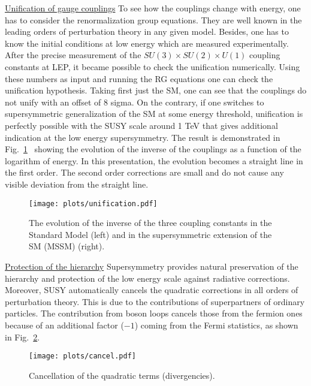 \documentclass{cernyrep}
\begin{document}
\underline{Unification of gauge couplings}
To see how the couplings change with energy, one has to consider the renormalization group equations. They are well known in the leading orders of perturbation theory in any given model.
Besides, one has to know the initial conditions at low energy which are measured experimentally.
After the precise measurement of the $SU(3)\times SU(2) \times
U(1)$ coupling constants at LEP, it became possible to check the
unification numerically. Using these numbers as input and running the RG equations one can check the unification hypothesis.  Taking first just the SM, one can see that the couplings do not unify with an offset of 8 sigma. On the contrary, if one switches  to supersymmetric generalization of the SM at some energy threshold, unification is perfectly possible with the SUSY scale around 1 TeV that gives additional indication at the low energy supersymmetry. 
The result is demonstrated in Fig.~\ref{unif}~\cite{ABF} showing the
evolution of the inverse of the couplings as a function of the
logarithm of energy. In this presentation, the evolution becomes
a straight line in the first order. The second order corrections
are small and do not cause any visible deviation from the
straight line. 
%
\begin{figure}[htb]
\begin{center}
\leavevmode
\texttt{[image: plots/unification.pdf]}
\vspace*{-10mm}
\end{center}
\caption{The evolution of the inverse of the three coupling
constants in the Standard Model (left) and in the supersymmetric
extension of the SM (MSSM) (right).}
\label{unif}
\end{figure}



\underline{Protection of the hierarchy}
Supersymmetry provides natural preservation of the hierarchy and
protection of the low energy scale against radiative corrections. 
Moreover, SUSY
automatically cancels the quadratic corrections in all orders
of perturbation theory. This is due to the contributions
of superpartners of ordinary particles. The contribution from
boson loops cancels those from the fermion ones because of an
additional factor ($-1$) coming from the Fermi statistics,
as shown in Fig.~\ref{fig:cancel}.
\begin{figure}[htb]
\begin{center}
\leavevmode
\texttt{[image: plots/cancel.pdf]}
\end{center}
\vspace{-6mm}
\caption{Cancellation of the quadratic terms (divergencies).}
\label{fig:cancel}
\end{figure}
\end{document}
